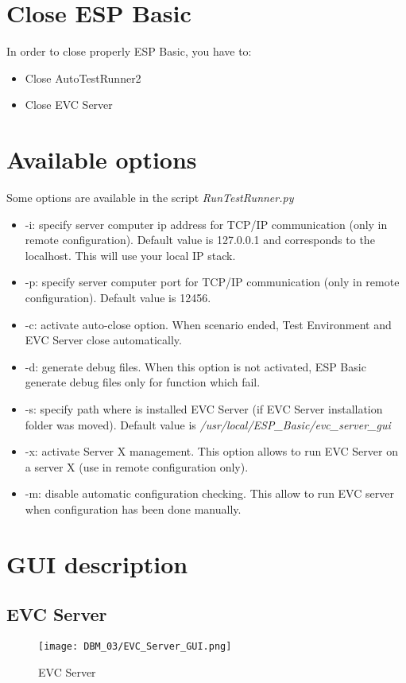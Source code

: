 \section{Close ESP Basic}
In order to close properly ESP Basic, you have to:
\begin{itemize}
\item Close AutoTestRunner2
\item Close EVC Server
\end{itemize}

\section{Available options}
Some options are available in the script \emph{RunTestRunner.py}
\begin{itemize}
\item -i: specify server computer ip address for TCP/IP communication (only in remote configuration). Default value is 127.0.0.1 and corresponds to the localhost. This will use your local IP stack.
\item -p: specify server computer port for TCP/IP communication (only in remote configuration). Default value is 12456.
\item -c: activate auto-close option. When scenario ended, Test Environment and EVC Server close automatically.
\item -d: generate debug files. When this option is not activated, ESP Basic generate debug files only for function which fail.
\item -s: specify path where is installed EVC Server (if EVC Server installation folder was moved). Default value is \emph{/usr/local/ESP\_Basic/evc\_server\_gui}
\item -x: activate Server X management. This option allows to run EVC Server on a server X (use in remote configuration only).
\item -m: disable automatic configuration checking. This allow to run EVC server when configuration has been done manually.
\end{itemize}
\section{GUI description}
\subsection{EVC Server}
	\begin{figure}[!h]
		\centering
		\texttt{[image: DBM\_03/EVC\_Server\_GUI.png]}
		\caption{EVC Server}
		\label{fig:EVC Server}
	\end{figure}
	
